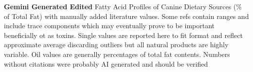 


%

\begin{table}[h!]
    \centering
    \caption{\textbf{Gemini Generated Edited} Fatty Acid Profiles of Canine Dietary Sources (\% of Total Fat) with manually added literature values. Some refs \cite{Ozbay_Determination_fatty_acid_2026} contain ranges and include trace components 
which may eventually prove to be important beneficially ot as toxins. 
Single values are reported here to fit format and reflect approximate
average discarding outliers but all natural products are highly variable.  
Oil values are generally percentages of total fat contents. Numbers without citations were probably AI generated and should be verified }
    \label{tab:fatty-acids-comprehensive}
    \vspace{2mm}
\setlength{\tabcolsep}{12pt} %


\end{table}
